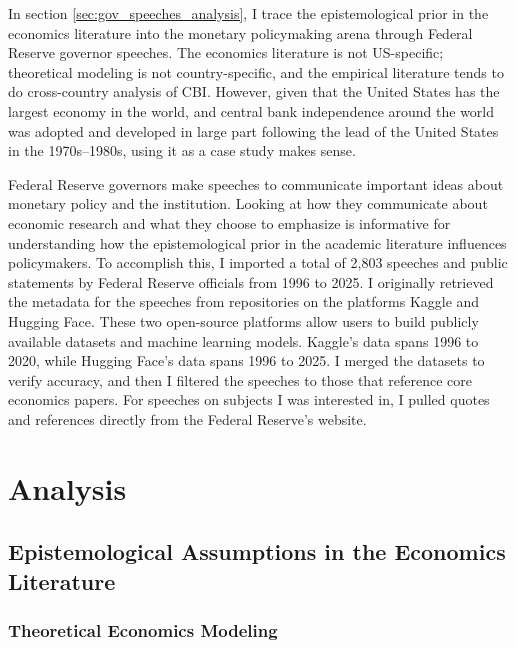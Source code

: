 \documentclass[12pt,a4paper]{article}
\begin{document}
\begin{doublespace}
In section \ref{sec:gov_speeches_analysis}, I trace the epistemological prior in the economics literature into the monetary policymaking arena through Federal Reserve governor speeches. The economics literature is not US-specific; theoretical modeling is not country-specific, and the empirical literature tends to do cross-country analysis of CBI. However, given that the United States has the largest economy in the world, and central bank independence around the world was adopted and developed in large part following the lead of the United States in the 1970s--1980s, using it as a case study makes sense.  

Federal Reserve governors make speeches to communicate important ideas about monetary policy and the institution. Looking at how they communicate about economic research and what they choose to emphasize is informative for understanding how the epistemological prior in the academic literature influences policymakers. To accomplish this, I imported a total of 2,803 speeches and public statements by Federal Reserve officials from 1996 to 2025. I originally retrieved the metadata for the speeches from repositories on the platforms Kaggle and Hugging Face. These two open-source platforms allow users to build publicly available datasets and machine learning models. Kaggle's data spans 1996 to 2020, while Hugging Face's data spans 1996 to 2025. I merged the datasets to verify accuracy, and then I filtered the speeches to those that reference core economics papers. For speeches on subjects I was interested in, I pulled quotes and references directly from the Federal Reserve’s website.


 


\section{Analysis}
\label{sec:analysis_all}

\subsection{Epistemological Assumptions in the Economics Literature}
\label{sec:analysis_papers_all}

\subsubsection{Theoretical Economics Modeling}
\label{sec:analysis_theoretical_models}




\end{doublespace}
\end{document}
